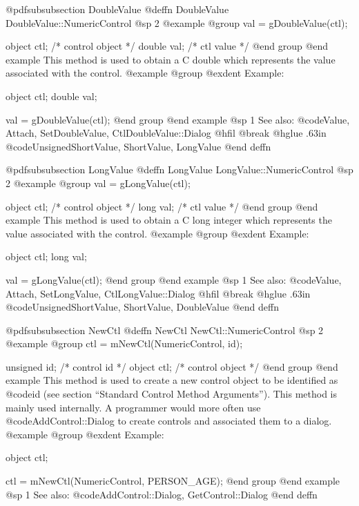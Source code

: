 @pdfsubsubsection {DoubleValue}
@deffn {DoubleValue} DoubleValue::NumericControl
@sp 2
@example
@group
val = gDoubleValue(ctl);

object  ctl;   /*  control object  */
double  val;   /*  ctl value       */
@end group
@end example
This method is used to obtain a C double which represents the
value associated with the control.  
@example
@group
@exdent Example:

object  ctl;
double  val;

val = gDoubleValue(ctl);
@end group
@end example
@sp 1
See also:  @code{Value, Attach, SetDoubleValue, CtlDoubleValue::Dialog}
@hfil @break @hglue .63in @code{UnsignedShortValue, ShortValue, LongValue}
@end deffn











@pdfsubsubsection {LongValue}
@deffn {LongValue} LongValue::NumericControl
@sp 2
@example
@group
val = gLongValue(ctl);

object  ctl;   /*  control object  */
long    val;   /*  ctl value       */
@end group
@end example
This method is used to obtain a C long integer which represents the
value associated with the control.  
@example
@group
@exdent Example:

object  ctl;
long    val;

val = gLongValue(ctl);
@end group
@end example
@sp 1
See also:  @code{Value, Attach, SetLongValue, CtlLongValue::Dialog}
@hfil @break @hglue .63in @code{UnsignedShortValue, ShortValue, DoubleValue}
@end deffn








@pdfsubsubsection {NewCtl}
@deffn {NewCtl} NewCtl::NumericControl
@sp 2
@example
@group
ctl = mNewCtl(NumericControl, id);

unsigned  id;   /*  control id      */
object   ctl;   /*  control object  */
@end group
@end example
This method is used to create a new control object to be identified as
@code{id} (see section ``Standard Control Method Arguments'').  This
method is mainly used internally.  A programmer would more often
use @code{AddControl::Dialog} to create controls and associated them
to a dialog.
@example
@group
@exdent Example:

object  ctl;

ctl = mNewCtl(NumericControl, PERSON_AGE);
@end group
@end example
@sp 1
See also:  @code{AddControl::Dialog, GetControl::Dialog}
@end deffn









